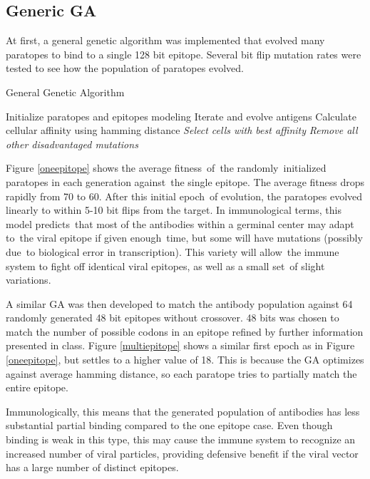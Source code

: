 \documentclass[conference]{IEEEtran}
\begin{document}
\subsection{Generic GA}

At first, a general genetic algorithm was implemented that evolved many paratopes to bind to a single 128 bit epitope. Several bit flip mutation rates were tested to see how the population of paratopes evolved.

\begin{algorithm}
    \caption{General Genetic Algorithm}\label{alg:cap}
        \State Initialize paratopes and epitopes modeling
            \State Iterate and evolve antigens
            \State Calculate cellular affinity using hamming distance
                \State \textit{Select cells with best affinity}
                \State \textit{Remove all other disadvantaged mutations}
            \EndFor
        \EndFor
\end{algorithm}

Figure \ref{oneepitope} shows the average fitness of the randomly initialized paratopes in each generation against the single epitope. The average fitness drops rapidly from 70 to 60. After this initial epoch of evolution, the paratopes evolved linearly to within 5-10 bit flips from the target. In immunological terms, this model predicts that most of the antibodies within a germinal center may adapt to the viral epitope if given enough time, but some will have mutations (possibly due to biological error in transcription). This variety will allow the immune system to fight off identical viral epitopes, as well as a small set of slight variations. 

A similar GA was then developed to match the antibody population against 64 randomly generated 48 bit epitopes without crossover. 48 bits was chosen to match the number of possible codons in an epitope refined by further information presented in class. Figure \ref{multiepitope} shows a similar first epoch as in Figure \ref{oneepitope}, but settles to a higher value of 18. This is because the GA optimizes against average hamming distance, so each paratope tries to partially match the entire epitope. 

Immunologically, this means that the generated population of antibodies has less substantial partial binding compared to the one epitope case. Even though binding is weak in this type, this may cause the immune system to recognize an increased number of viral particles, providing defensive benefit if the viral vector has a large number of distinct epitopes.
\end{document}
